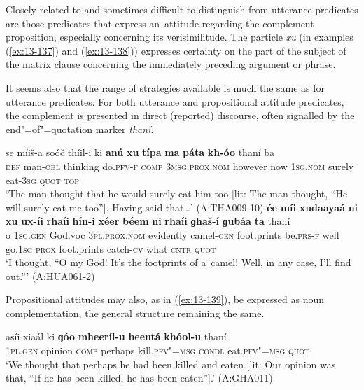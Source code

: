  Closely related to and sometimes difficult to distinguish from utterance predicates are those predicates that express an~attitude regarding the complement proposition, especially concerning its verisimilitude. The particle \textit{xu} (in examples (\ref{ex:13-137}) and (\ref{ex:13-138})) expresses certainty on the part of the subject of the matrix clause concerning the immediately preceding argument or phrase.


It seems also that the range of strategies available is much the same as for utterance predicates. For both utterance and propositional attitude predicates, the complement is presented in direct (reported) discourse, often signalled by the end"=of"=quotation marker \textit{thaní}. 

\ea
\label{ex:13-137}
\gll se míiš-a soóč thíil-i ki \textbf{anú} \textbf{xu} \textbf{típa} \textbf{ma} \textbf{páta} \textbf{kh-óo} thaní ba\\
\textsc{def } man-\textsc{obl} thinking do.\textsc{pfv-f} \textsc{comp} \textsc{3msg.prox.nom} however now \textsc{1sg.nom} surely eat-\textsc{3sg} \textsc{quot} \textsc{top}\\
\glt `The man thought that he would surely eat him too [lit: The man thought, ``He will surely eat me too'']. Having said that{\ldots}' (A:THA009-10)
\ex
\label{ex:13-138}
\gll \textbf{ée} \textbf{míi} \textbf{xudaayaá} \textbf{ni} \textbf{xu} \textbf{ux-íi} \textbf{rhaíi} \textbf{hín-i} \textbf{xéer} \textbf{béem} \textbf{ni} \textbf{rhaíi} \textbf{ɡhaš-í} \textbf{ɡubáa} \textbf{ta} thaní\\
o \textsc{1sg.gen} God.voc \textsc{3pl.prox.nom} evidently camel-\textsc{gen} foot.prints be.\textsc{prs-f} well go.\textsc{1sg} \textsc{prox} foot.prints catch-\textsc{cv} what \textsc{cntr} \textsc{quot}\\
\glt `I thought, ``O my God! It's the footprints of a~camel! Well, in any case, I'll find out.''' (A:HUA061-2) 
\z

Propositional attitudes may also, as in (\ref{ex:13-139}), be expressed as noun complementation, the general structure remaining the same.

\begin{exe}
\ex
\label{ex:13-139}
\gll asíi xiaál ki \textbf{ɡóo} \textbf{mheeríl-u} \textbf{heentá} \textbf{ khóol-u} thaní \\
\textsc{1pl}.\textsc{gen}  opinion \textsc{comp} perhaps kill.\textsc{pfv"=msg}  \textsc{condl} eat.\textsc{pfv"=msg} \textsc{quot} \\
\glt `We thought that perhaps he had been killed and eaten [lit: Our opinion was that, ``If he has been killed, he has been eaten''].' (A:GHA011) 
\end{exe}

